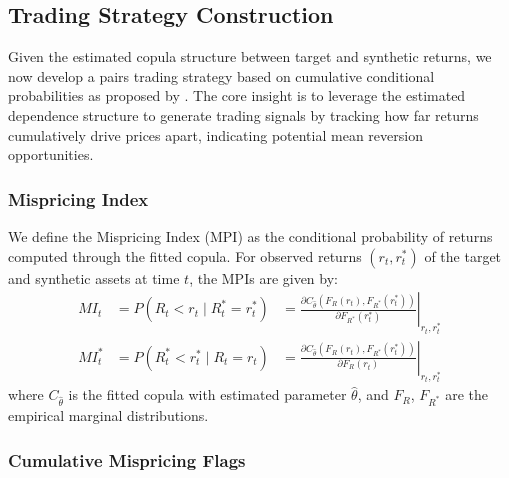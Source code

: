 
\subsection{Trading Strategy Construction}

Given the estimated copula structure between target and synthetic returns, we now develop a pairs trading strategy based on cumulative conditional probabilities as proposed by \cite{xie2016}. The core insight is to leverage the estimated dependence structure to generate trading signals by tracking how far returns cumulatively drive prices apart, indicating potential mean reversion opportunities.

\subsubsection{Mispricing Index}

We define the Mispricing Index (MPI) as the conditional probability of returns computed through the fitted copula. For observed returns $(r_t, r_t^*)$ of the target and synthetic assets at time $t$, the MPIs are given by:
%
\begin{equation*}
\begin{array}{lll}
MI_t &= P(R_t < r_t \mid R_t^* = r_t^*) 
&= \left.\frac{\partial C_{\hat{\theta}}(F_R(r_t), F_{R^*}(r_t^*))}{\partial F_{R^*}(r_t^*)}\right|_{r_t,r_t^*}
\\[1em]
MI_t^* &= P(R_t^* < r_t^* \mid R_t = r_t) 
&
= \left.\frac{\partial C_{\hat{\theta}}(F_R(r_t), F_{R^*}(r_t^*))}{\partial F_R(r_t)}\right|_{r_t,r_t^*}
\end{array}
\end{equation*}
%
where $C_{\hat{\theta}}$ is the fitted copula with estimated parameter $\hat{\theta}$, and $F_R$, $F_{R^*}$ are the empirical marginal distributions.

\subsubsection{Cumulative Mispricing Flags}

